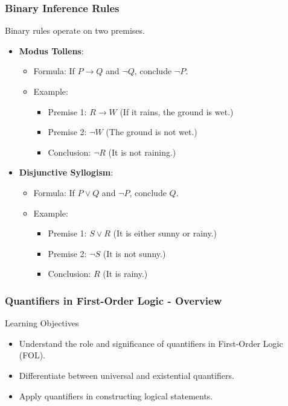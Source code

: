 \documentclass[aspectratio=169]{beamer}
\begin{document}
\begin{frame}[fragile]
    \frametitle{Binary Inference Rules}
    Binary rules operate on two premises.
    \begin{itemize}
        \item \textbf{Modus Tollens}:
        \begin{itemize}
            \item Formula: If \(P \rightarrow Q\) and \(\neg Q\), conclude \(\neg P\).
            \item Example:
                \begin{itemize}
                    \item Premise 1: \(R \rightarrow W\) (If it rains, the ground is wet.)
                    \item Premise 2: \(\neg W\) (The ground is not wet.)
                    \item Conclusion: \(\neg R\) (It is not raining.)
                \end{itemize}
        \end{itemize}
        \item \textbf{Disjunctive Syllogism}:
        \begin{itemize}
            \item Formula: If \(P \lor Q\) and \(\neg P\), conclude \(Q\).
            \item Example:
                \begin{itemize}
                    \item Premise 1: \(S \lor R\) (It is either sunny or rainy.)
                    \item Premise 2: \(\neg S\) (It is not sunny.)
                    \item Conclusion: \(R\) (It is rainy.)
                \end{itemize}
        \end{itemize}
    \end{itemize}
\end{frame}

\begin{frame}[fragile]
    \frametitle{Quantifiers in First-Order Logic - Overview}
    \begin{block}{Learning Objectives}
        \begin{itemize}
            \item Understand the role and significance of quantifiers in First-Order Logic (FOL).
            \item Differentiate between universal and existential quantifiers.
            \item Apply quantifiers in constructing logical statements.
        \end{itemize}
    \end{block}
\end{frame}
\end{document}

